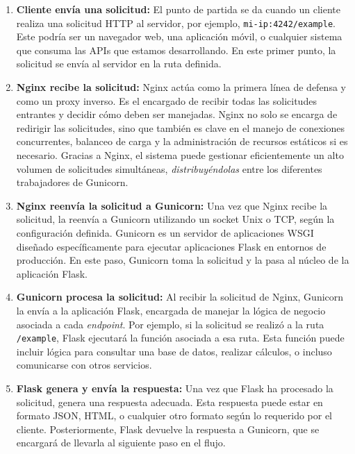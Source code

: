\begin{enumerate}
    \item \textbf{Cliente envía una solicitud:} 
    El punto de partida se da cuando un cliente realiza una solicitud HTTP al servidor, por ejemplo, \texttt{mi-ip:4242/example}. Este podría ser un navegador web, una aplicación móvil, o cualquier sistema que consuma las APIs que estamos desarrollando. En este primer punto, la solicitud se envía al servidor en la ruta definida.

    \item \textbf{Nginx recibe la solicitud:} 
    Nginx actúa como la primera línea de defensa y como un proxy inverso. Es el encargado de recibir todas las solicitudes entrantes y decidir cómo deben ser manejadas. Nginx no solo se encarga de redirigir las solicitudes, sino que también es clave en el manejo de conexiones concurrentes, balanceo de carga y la administración de recursos estáticos si es necesario. Gracias a Nginx, el sistema puede gestionar eficientemente un alto volumen de solicitudes simultáneas, \textit{distribuyéndolas} entre los diferentes trabajadores de Gunicorn.

    \item \textbf{Nginx reenvía la solicitud a Gunicorn:} 
    Una vez que Nginx recibe la solicitud, la reenvía a Gunicorn utilizando un socket Unix o TCP, según la configuración definida. Gunicorn es un servidor de aplicaciones WSGI diseñado específicamente para ejecutar aplicaciones Flask en entornos de producción. En este paso, Gunicorn toma la solicitud y la pasa al núcleo de la aplicación Flask.

    \item \textbf{Gunicorn procesa la solicitud:} 
    Al recibir la solicitud de Nginx, Gunicorn la envía a la aplicación Flask, encargada de manejar la lógica de negocio asociada a cada \textit{endpoint}. Por ejemplo, si la solicitud se realizó a la ruta \texttt{/example}, Flask ejecutará la función asociada a esa ruta. Esta función puede incluir lógica para consultar una base de datos, realizar cálculos, o incluso comunicarse con otros servicios.

    \item \textbf{Flask genera y envía la respuesta:} 
    Una vez que Flask ha procesado la solicitud, genera una respuesta adecuada. Esta respuesta puede estar en formato JSON, HTML, o cualquier otro formato según lo requerido por el cliente. Posteriormente, Flask devuelve la respuesta a Gunicorn, que se encargará de llevarla al siguiente paso en el flujo.


\end{enumerate}
